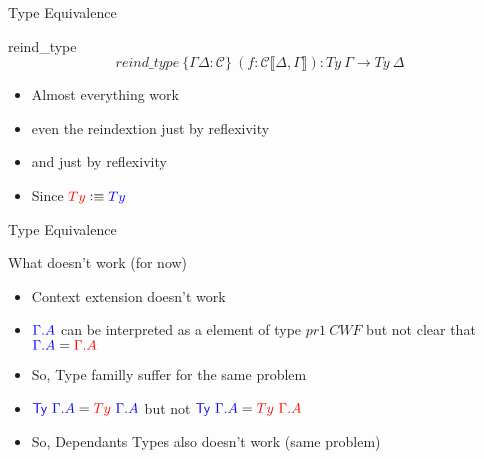 \documentclass[
  ignorenonframetext,
  aspectratio=169,
  usenames,
  dvipsnames
]{beamer}
\newcommand{\constfont}[1]{\ensuremath{\mathsf{#1}}}
\newcommand{\CC}{{\mathcal{C}}}
\newcommand{\Ty}{\constfont{Ty}}
\newcommand{\rl}[1]{\color{red}#1\color{black}}
\newcommand{\bl}[1]{\color{blue}#1\color{black}}
\newcommand{\defeq}{\vcentcolon\equiv}
\begin{document}
\begin{frame}{Type Equivalence}
  \begin{block}{reind\_type}
    $$reind\_type\ \{\Gamma \Delta :\CC\}\  (f :\CC \llbracket \Delta,\Gamma \rrbracket): Ty\ \Gamma \rightarrow Ty\ \Delta$$
  \end{block}
  \begin{itemize}
    \item Almost everything work
    \item even the reindextion just by reflexivity 
    \item and just by reflexivity
    \item Since $\rl{Ty} \defeq \bl{Ty}$
  \end{itemize}
\end{frame}

\begin{frame}{Type Equivalence}
  \begin{block}{What doesn't work (for now)}
  \begin{itemize}
    \item Context extension doesn't work 
    \item $\bl{\Gamma.A}$ can be interpreted as a element of type $pr1\ CWF$ but not clear that $\bl{\Gamma.A} = \rl{\Gamma.A}$
    \item So, Type familly suffer for the same problem
    \item $\bl{\Ty\ \Gamma.A} = \rl{Ty}\ \bl{\Gamma.A}$ but not $\bl{\Ty\ \Gamma.A} = \rl{Ty\ \Gamma.A}$
    \item So, Dependants Types also doesn't work (same problem)
  \end{itemize}
  \end{block}
\end{frame}
\end{document}
